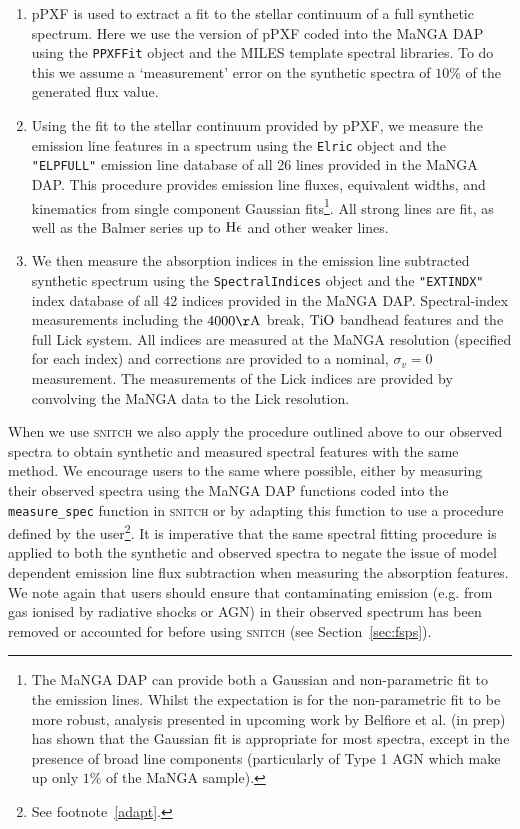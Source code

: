 \documentclass[useAMS,usenatbib]{mn2e}
\def\referee		{\color{refer}}
\def\refereeii		{\color{refer2}}
\begin{document}
\begin{enumerate}
\item pPXF \citep{cappellari04} is used to extract a fit to the stellar continuum of a full synthetic spectrum. Here we use the version of pPXF coded into the MaNGA DAP using the \texttt{PPXFFit} object and the MILES template spectral libraries. To do this we assume a `measurement' error on the synthetic spectra of $10\%$ of the generated flux value. 
\item Using the fit to the stellar continuum provided by pPXF, we measure the emission line features in a spectrum using the \texttt{Elric} object and the \texttt{"ELPFULL"} emission line database of all 26 lines provided in the MaNGA DAP. This procedure provides emission line fluxes, equivalent widths, and kinematics from single component Gaussian fits\footnote{{\referee The MaNGA DAP can provide both a Gaussian and non-parametric fit to the emission lines. Whilst the expectation is for the non-parametric fit to be more robust, analysis presented in upcoming work by Belfiore et al. (in prep) has shown that the Gaussian fit is appropriate for most spectra, except in the presence of broad line components (particularly of Type 1 AGN which make up only $1\%$ of the MaNGA sample).}}. All strong lines are fit, as well as the Balmer series up to $\rm{H}\epsilon$ and other weaker lines. 
\item We then measure the absorption indices in the emission line subtracted synthetic spectrum using the \texttt{SpectralIndices} object and the \texttt{"EXTINDX"} index database of all 42 indices provided in the MaNGA DAP. Spectral-index measurements including the $4000\rm{\AA}$ break, $\rm{TiO}$ bandhead features and the full Lick system. All indices are measured at the MaNGA resolution (specified for each index) and corrections are provided to a nominal, $\sigma_v = 0$ measurement. The measurements of the Lick indices are provided by convolving the MaNGA data to the Lick resolution. 
\end{enumerate}

When we use \textsc{snitch} we also apply the procedure outlined above to our observed spectra to obtain synthetic and measured spectral features with the same method. We encourage users to the same where possible, either by measuring their observed spectra using the MaNGA DAP functions coded into the \texttt{measure\_spec} function in \textsc{snitch} or by adapting this function to use a procedure defined by the user\footnote{See footnote~\ref{adapt}.}. {\referee It is imperative that the same spectral fitting procedure is applied to both the synthetic and observed spectra to negate the issue of model dependent emission line flux subtraction when measuring the absorption features. We note again that users should ensure that contaminating emission (e.g. {\refereeii from gas ionised by radiative shocks or AGN}) in their observed spectrum has been removed or accounted for before using \textsc{snitch} (see Section~\ref{sec:fsps}).}
\end{document}
